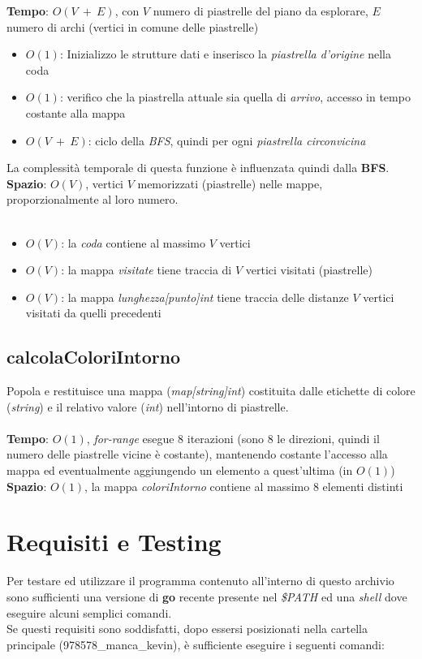 \documentclass{article}
\begin{document}
\textbf{Tempo}: \(O(V\ +\ E)\), con \(V\) numero di piastrelle del piano da esplorare, \(E\) numero di archi (vertici in comune delle piastrelle)\\
\begin{itemize}
  \item \(O(1)\): Inizializzo le strutture dati e inserisco la \textit{piastrella d'origine} nella coda
  \item \(O(1)\): verifico che la piastrella attuale sia quella di \textit{arrivo}, accesso in tempo costante alla mappa 
  \item \(O(V\ +\ E)\): ciclo della \textit{BFS}, quindi per ogni \textit{piastrella circonvicina}
\end{itemize}
La complessità temporale di questa funzione è influenzata quindi dalla \textbf{BFS}.\\
\textbf{Spazio}: \(O(V)\), vertici \(V\) memorizzati (piastrelle) nelle mappe, proporzionalmente al loro numero.
\\ \\
\begin{itemize}
  \item \(O(V)\): la \textit{coda} contiene al massimo \(V\) vertici
  \item \(O(V)\): la mappa \textit{visitate} tiene traccia di \(V\) vertici visitati (piastrelle)
  \item \(O(V)\): la mappa \textit{lunghezza[punto]int} tiene traccia delle distanze \(V\) vertici visitati da quelli precedenti
\end{itemize}

\subsection{calcolaColoriIntorno}\label{subsec:evalColorsAround}
Popola e restituisce una mappa (\textit{map[string]int}) costituita dalle etichette di colore (\textit{string}) e il relativo valore (\textit{int}) nell'intorno di piastrelle.
\\ \\
\textbf{Tempo}: \(O(1)\), \textit{for-range} esegue 8 iterazioni (sono 8 le direzioni, quindi il numero delle piastrelle vicine è costante), mantenendo costante l'accesso alla mappa ed eventualmente aggiungendo un elemento a quest'ultima (in \(O(1)\))\\
\textbf{Spazio}: \(O(1)\), la mappa \textit{coloriIntorno} contiene al massimo 8 elementi distinti


\section{Requisiti e Testing}
Per testare ed utilizzare il programma contenuto all'interno di questo archivio sono sufficienti una versione di \textbf{go} recente presente nel \textit{\$PATH} ed una \textit{shell} dove eseguire alcuni semplici comandi.\\
Se questi requisiti sono soddisfatti, dopo essersi posizionati nella cartella principale (978578\_manca\_kevin), è sufficiente eseguire i seguenti comandi:
\end{document}
